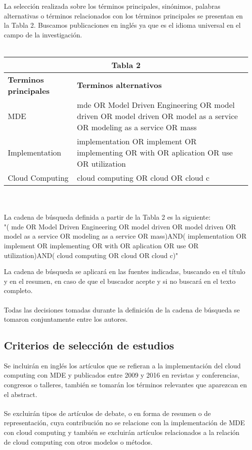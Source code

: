 \documentclass{llncs}
\begin{document}
La selección realizada sobre los términos principales, sinónimos, palabras alternativas o términos relacionados con los términos principales se presentan en la Tabla 2. Buscamos publicaciones en inglés ya que es el idioma universal en el campo de la investigación.\\ \\
\begin{tabular}{  | p{5cm} | p{7cm}  | }
  \hline
  \multicolumn{2}{|c|}{\bf Tabla 2} \\
  \hline
  \bf Terminos principales & \bf Terminos alternativos \\
  \hline
    MDE & mde OR Model Driven Engineering OR model driven OR model driven OR model as a service OR modeling as a service OR mass\\
   \hline
    Implementation & implementation OR implement OR implementing OR with OR aplication OR use OR utilization\\
   \hline
   Cloud Computing & cloud computing OR  cloud OR cloud c\\
   \hline
\end{tabular}\\ \\
La cadena de búsqueda definida a partir de la Tabla 2 es la siguiente: \\
"( mde OR Model Driven Engineering OR model driven OR model driven OR model as a service OR modeling as a service OR mass)AND( implementation OR implement OR implementing OR with OR aplication OR use OR utilization)AND( cloud computing OR  cloud OR cloud c)"

La cadena de búsqueda  se aplicará en las fuentes indicadas, buscando en el título y en el resumen, en caso de que el buscador acepte y si no buscará en el texto completo.\\ \\
Todas las decisiones tomadas durante la definición de la cadena de búsqueda se tomaron conjuntamente entre los autores.

\subsection{Criterios de selección de estudios}
Se incluirán en inglés los artículos que se refieran a la implementación del cloud computing con MDE y publicados entre 2009 y 2016 en revistas y conferencias, congresos o talleres, también se tomarán los términos relevantes que aparezcan en el abstract.\\\\
Se excluirán tipos de artículos de debate, o en forma de resumen o de representación, cuya contribución no se relacione con la implementación de MDE con cloud computing y también se excluirán artículos relacionados a la relación de cloud computing con otros modelos o métodos.
\end{document}

